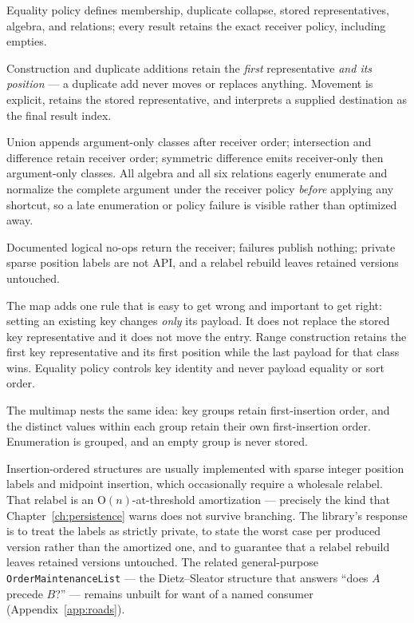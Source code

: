 \documentclass[11pt,twoside,openright]{book}
\newcommand{\code}[1]{\texorpdfstring{\textcolor{d7ink}{\texttt{#1}}}{#1}}
\newcommand{\bigoh}[1]{$\mathrm{O}(#1)$}
\begin{document}
\begin{contractbox}
Equality policy defines membership, duplicate collapse, stored representatives,
algebra, and relations; every result retains the exact receiver policy,
including empties.

Construction and duplicate additions retain the \emph{first} representative
\emph{and its position} --- a duplicate add never moves or replaces anything.
Movement is explicit, retains the stored representative, and interprets a
supplied destination as the final result index.

Union appends argument-only classes after receiver order; intersection and
difference retain receiver order; symmetric difference emits receiver-only then
argument-only classes. All algebra and all six relations eagerly enumerate and
normalize the complete argument under the receiver policy \emph{before} applying
any shortcut, so a late enumeration or policy failure is visible rather than
optimized away.

Documented logical no-ops return the receiver; failures publish nothing; private
sparse position labels are not API, and a relabel rebuild leaves retained
versions untouched.
\end{contractbox}

The map adds one rule that is easy to get wrong and important to get right:
setting an existing key changes \emph{only} its payload. It does not replace the
stored key representative and it does not move the entry. Range construction
retains the first key representative and its first position while the last
payload for that class wins. Equality policy controls key identity and never
payload equality or sort order.

The multimap nests the same idea: key groups retain first-insertion order, and
the distinct values within each group retain their own first-insertion order.
Enumeration is grouped, and an empty group is never stored.

\begin{asidebox}
Insertion-ordered structures are usually implemented with sparse integer
position labels and midpoint insertion, which occasionally require a wholesale
relabel. That relabel is an \bigoh{n}-at-threshold amortization --- precisely
the kind that Chapter~\ref{ch:persistence} warns does not survive branching.
The library's response is to treat the labels as strictly private, to state the
worst case per produced version rather than the amortized one, and to guarantee
that a relabel rebuild leaves retained versions untouched. The related
general-purpose \code{OrderMaintenanceList} --- the Dietz--Sleator structure that
answers ``does $A$ precede $B$?'' --- remains unbuilt for want of a named
consumer (Appendix~\ref{app:roads}).
\end{asidebox}
\end{document}
